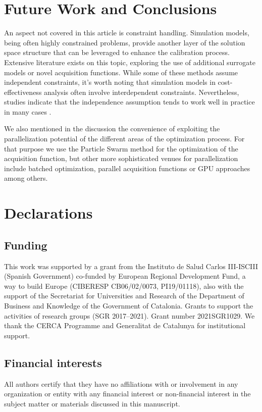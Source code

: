 \documentclass[sn-mathphys,Numbered]{sn-jnl}%
\begin{document}
\section{Future Work and Conclusions}
An aspect not covered in this article is constraint handling. Simulation models, being often highly constrained problems, provide another layer of the solution space structure that can be leveraged to enhance the calibration process. Extensive literature exists on this topic, exploring the use of additional surrogate models or novel acquisition functions\cite{gp-constraints}. While some of these methods assume independent constraints, it's worth noting that simulation models in cost-effectiveness analysis often involve interdependent constraints. Nevertheless, studies indicate that the independence assumption tends to work well in practice in many cases \cite{bo-constraint-dependence}.

We also mentioned in the discussion the convenience of exploiting the parallelization potential of the different areas of the optimization process. For that purpose we use the Particle Swarm method for the optimization of the acquisition function, but other more sophisticated venues for parallelization include batched optimization\cite{gp-batch}, parallel acquisition functions\cite{gp-parallel-acq-func} or GPU approaches\cite{gp-gpu} among others.


\section*{Declarations}
\subsection*{Funding}
This work was supported by a grant from the Instituto de Salud Carlos III-ISCIII (Spanish Government) co-funded by European Regional Development Fund, a way to build Europe (CIBERESP CB06/02/0073, PI19/01118), also with the support of the Secretariat for Universities and Research of the Department of Business and Knowledge of the Government of Catalonia. Grants to support the activities of research groups (SGR 2017–2021). Grant number 2021SGR1029. We thank the CERCA Programme and Generalitat de Catalunya for institutional support.
\subsection*{Financial interests}
All authors certify that they have no affiliations with or involvement in any organization or entity with any financial interest or non-financial interest in the subject matter or materials discussed in this manuscript.
\end{document}
